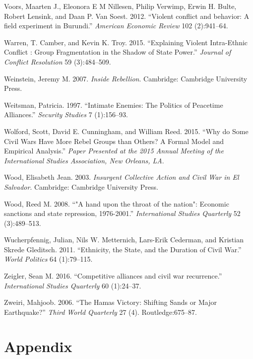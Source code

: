 \documentclass[12pt,]{book}
\theoremstyle{definition}
\theoremstyle{definition}
\theoremstyle{definition}
\theoremstyle{remark}
\begin{document}
\leavevmode\hypertarget{ref-Voors2012}{}%
Voors, Maarten J., Eleonora E M Nillesen, Philip Verwimp, Erwin H.
Bulte, Robert Lensink, and Daan P. Van Soest. 2012. ``Violent conflict
and behavior: A field experiment in Burundi.'' \emph{American Economic
Review} 102 (2):941--64.

\leavevmode\hypertarget{ref-Warren2015}{}%
Warren, T. Camber, and Kevin K. Troy. 2015. ``Explaining Violent
Intra-Ethnic Conflict : Group Fragmentation in the Shadow of State
Power.'' \emph{Journal of Conflict Resolution} 59 (3):484--509.

\leavevmode\hypertarget{ref-Weinstein2007}{}%
Weinstein, Jeremy M. 2007. \emph{Inside Rebellion}. Cambridge: Cambridge
University Press.

\leavevmode\hypertarget{ref-Weitsman1997}{}%
Weitsman, Patricia. 1997. ``Intimate Enemies: The Politics of Peacetime
Alliances.'' \emph{Security Studies} 7 (1):156--93.

\leavevmode\hypertarget{ref-Wolford}{}%
Wolford, Scott, David E. Cunningham, and William Reed. 2015. ``Why do
Some Civil Wars Have More Rebel Groups than Others? A Formal Model and
Empirical Analysis.'' \emph{Paper Presented at the 2015 Annual Meeting
of the International Studies Association, New Orleans, LA}.

\leavevmode\hypertarget{ref-Wood2003}{}%
Wood, Elisabeth Jean. 2003. \emph{Insurgent Collective Action and Civil
War in El Salvador}. Cambridge: Cambridge University Press.

\leavevmode\hypertarget{ref-Wood2008a}{}%
Wood, Reed M. 2008. ``"A hand upon the throat of the nation": Economic
sanctions and state repression, 1976-2001.'' \emph{International Studies
Quarterly} 52 (3):489--513.

\leavevmode\hypertarget{ref-Wucherpfennig2011}{}%
Wucherpfennig, Julian, Nils W. Metternich, Lars-Erik Cederman, and
Kristian Skrede Gleditsch. 2011. ``Ethnicity, the State, and the
Duration of Civil War.'' \emph{World Politics} 64 (1):79--115.

\leavevmode\hypertarget{ref-Zeigler2016}{}%
Zeigler, Sean M. 2016. ``Competitive alliances and civil war
recurrence.'' \emph{International Studies Quarterly} 60 (1):24--37.

\leavevmode\hypertarget{ref-Zweiri2006}{}%
Zweiri, Mahjoob. 2006. ``The Hamas Victory: Shifting Sands or Major
Earthquake?'' \emph{Third World Quarterly} 27 (4). Routledge:675--87.



\hypertarget{appendix}{%
\chapter*{Appendix}\label{appendix}}
\end{document}
